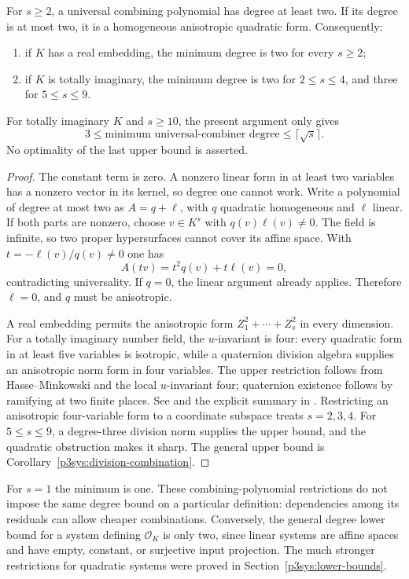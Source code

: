 \begin{proposition}\label{p3sys:quadratic-combiner-optimality}
For $s\ge2$, a universal combining polynomial has degree at
least two.  If its degree is at most two, it is a homogeneous
anisotropic quadratic form.  Consequently:
\begin{enumerate}
\item if $K$ has a real embedding, the minimum degree is two
for every $s\ge2$;
\item if $K$ is totally imaginary, the minimum degree is two
for $2\le s\le4$, and three for $5\le s\le9$.
\end{enumerate}
For totally imaginary $K$ and $s\ge10$, the present argument
only gives
\[
 3\le\text{minimum universal-combiner degree}
                         \le\lceil\sqrt{s}\rceil.
\]
No optimality of the last upper bound is asserted.
\end{proposition}
\begin{proof}
The constant term is zero.  A nonzero linear form in at least
two variables has a nonzero vector in its kernel, so degree one
cannot work.  Write a polynomial of degree at most two as
$A=q+\ell$, with $q$ quadratic homogeneous and $\ell$ linear.
If both parts are nonzero, choose $v\in K^s$ with
$q(v)\ell(v)\ne0$.  The field is infinite, so two proper
hypersurfaces cannot cover its affine space.  With
$t=-\ell(v)/q(v)\ne0$ one has
\[
                          A(tv)=t^2q(v)+t\ell(v)=0,
\]
contradicting universality.  If $q=0$, the linear argument
already applies.  Therefore $\ell=0$, and $q$ must be
anisotropic.

A real embedding permits the anisotropic form
$Z_1^2+\cdots+Z_s^2$ in every dimension.  For a totally
imaginary number field, the $u$-invariant is four: every
quadratic form in at least five variables is isotropic, while
a quaternion division algebra supplies an anisotropic norm
form in four variables.  The upper restriction follows from
Hasse--Minkowski and the local $u$-invariant four; quaternion
existence follows by ramifying at two finite places.  See
\cite[Theorems~14.6.1 and 14.6.9]{Voight2021} and the explicit
summary in \cite[Section~5.1]{p3sysMerkurjevParimala2025}.
Restricting an anisotropic four-variable form to a coordinate
subspace treats $s=2,3,4$.  For $5\le s\le9$, a degree-three
division norm supplies the upper bound, and the quadratic
obstruction makes it sharp.  The general upper bound is
Corollary~\ref{p3sys:division-combination}.
\end{proof}

For $s=1$ the minimum is one.  These combining-polynomial
restrictions do not impose the same degree bound on a
particular definition: dependencies among its residuals can
allow cheaper combinations.  Conversely, the general degree
lower bound for a system defining $\mathcal O_K$ is only two,
since linear systems are affine spaces and have empty, constant,
or surjective input projection.  The much stronger restrictions
for quadratic systems were proved in
Section~\ref{p3sys:lower-bounds}.
